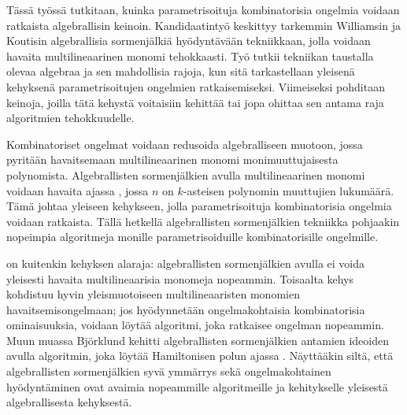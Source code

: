 %
%

\begin{fiabstract}
  Tässä työssä tutkitaan, kuinka parametrisoituja kombinatorisia ongelmia voidaan 
  ratkaista %
  algebrallisin keinoin. Kandidaatintyö keskittyy tarkemmin 
  Williamsin ja Koutisin algebrallisia sormenjälkiä hyödyntävään 
  tekniikkaan, jolla voidaan havaita multilineaarinen monomi tehokkaasti. 
  Työ tutkii tekniikan taustalla olevaa algebraa ja sen mahdollisia rajoja,  
  kun sitä tarkastellaan yleisenä kehyksenä parametrisoitujen ongelmien ratkaisemiseksi. 
  Viimeiseksi pohditaan keinoja, joilla tätä kehystä voitaisiin kehittää tai jopa 
  ohittaa sen antama raja algoritmien tehokkuudelle. 

  Kombinatoriset ongelmat voidaan redusoida algebralliseen muotoon, jossa 
  pyritään havaitsemaan multilineaarinen monomi monimuuttujaisesta polynomista. 
  Algebrallisten sormenjälkien avulla multilineaarinen monomi 
  voidaan havaita ajassa , 
  jossa $n$ on $k$-asteisen polynomin muuttujien lukumäärä. Tämä johtaa yleiseen kehykseen, 
  jolla parametrisoituja kombinatorisia ongelmia voidaan ratkaista. 
  Tällä hetkellä algebrallisten sormenjälkien 
  tekniikka pohjaakin nopeimpia algoritmeja monille parametrisoiduille 
  kombinatorisille ongelmille.

   on kuitenkin 
  kehyksen alaraja: algebrallisten sormenjälkien 
  avulla ei voida yleisesti havaita multilineaarisia monomeja nopeammin. Toisaalta 
  kehys kohdistuu hyvin yleismuotoiseen multilineaaristen monomien havaitsemisongelmaan; 
  jos hyödynnetään ongelmakohtaisia kombinatorisia ominaisuuksia, 
  voidaan löytää algoritmi, joka ratkaisee ongelman nopeammin. 
  Muun muassa Björklund kehitti 
  algebrallisten sormenjälkien antamien ideoiden avulla algoritmin, joka 
  löytää Hamiltonisen polun ajassa . 
  Näyttääkin siltä, että algebrallisten sormenjälkien syvä ymmärrys sekä ongelmakohtainen 
  hyödyntäminen ovat avaimia nopeammille algoritmeille ja kehitykselle yleisestä algebrallisesta 
  kehyksestä.
%

\end{fiabstract}
